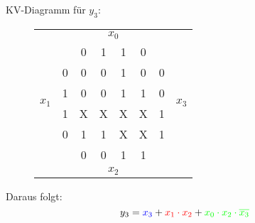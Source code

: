 \documentclass[DIN, pagenumber=false, fontsize=11pt, parskip=half]{scrartcl}
\begin{document}
\begin{enumerate}[label=(\alph*)]
			KV-Diagramm für $y_3$:
			\begin{figure}[H]
                \centering
                \begin{tabular}{cc|cccc|cc}
                    & &  & \multicolumn{2}{c}{$x_0$} & & \\
                    & & 0 & 1 & 1 & 0\\
                    \midrule
                    \multirow{4}{*}{$x_1$} & 0 & 0 & 0 & \cellcolor{green!50}1 & 0 & 0 &\multirow{4}{*}{$x_3$}\\
                     & 1 & 0 & 0 & \cellcolor{yellow!50}1 & \cellcolor{red!50}1 & 0\\
                     & 1 & \cellcolor{blue!50}X & \cellcolor{blue!50}X & \cellcolor{purple!50}X & \cellcolor{purple!50}X & 1\\
                     & 0 & \cellcolor{blue!50}1 & \cellcolor{blue!50}1 & \cellcolor{blue!50}X & \cellcolor{blue!50}X & 1\\
                    \midrule
                    & & 0 & 0 & 1 & 1\\
                    & &  & \multicolumn{2}{c}{$x_2$} & & \\
                \end{tabular}
            \end{figure}
			Daraus folgt:
			\begin{equation*}
				y_3 = \textcolor{blue}{x_3} + \textcolor{red}{x_1 \cdot x_2} + \textcolor{green}{x_0 \cdot x_2 \cdot \overline{x_3}}
			\end{equation*}
    \end{enumerate}
\end{document}
